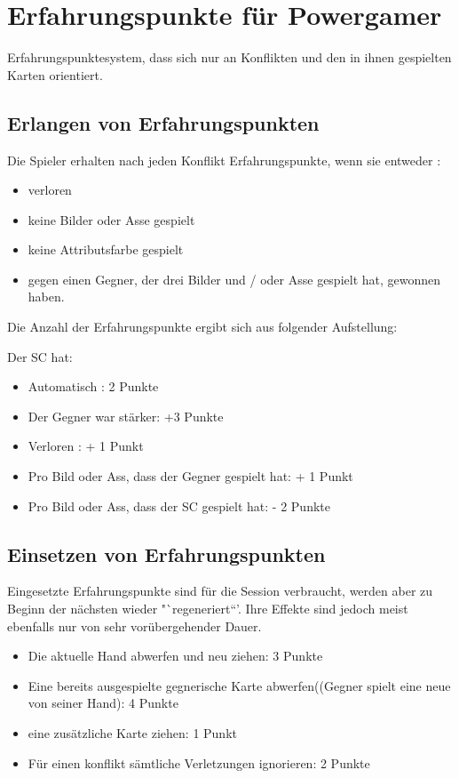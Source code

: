 \section{Erfahrungspunkte für Powergamer }
Erfahrungspunktesystem, dass sich nur an Konflikten und den in ihnen gespielten Karten orientiert.
\subsection{Erlangen von Erfahrungspunkten}

Die Spieler erhalten nach jeden Konflikt Erfahrungspunkte, wenn sie entweder :
\begin{itemize}
\item verloren
\item keine Bilder oder Asse gespielt
\item keine Attributsfarbe gespielt
\item gegen einen Gegner, der drei Bilder und / oder Asse gespielt hat, gewonnen haben.
\end{itemize}

Die Anzahl der Erfahrungspunkte ergibt sich aus folgender Aufstellung:

Der SC hat:
\begin{itemize}
\item Automatisch : 2 Punkte
\item Der Gegner war stärker: +3 Punkte
\item Verloren : + 1 Punkt
\item Pro Bild oder Ass, dass der Gegner gespielt hat: + 1 Punkt
\item Pro Bild oder Ass, dass der SC gespielt hat: - 2 Punkte
\end{itemize}

 

\subsection{Einsetzen von Erfahrungspunkten}

Eingesetzte Erfahrungspunkte sind für die Session verbraucht, werden aber zu Beginn der nächsten wieder "`regeneriert“'. Ihre Effekte sind jedoch meist ebenfalls nur von sehr vorübergehender Dauer.
\begin{itemize}
\item Die aktuelle Hand abwerfen und neu ziehen: 3 Punkte
\item Eine bereits ausgespielte gegnerische Karte abwerfen((Gegner spielt eine neue von seiner Hand): 4 Punkte
\item eine zusätzliche Karte ziehen: 1 Punkt
\item Für einen konflikt sämtliche Verletzungen ignorieren: 2 Punkte
\end{itemize}

